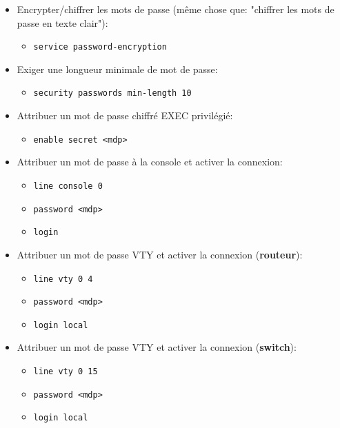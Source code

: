 \documentclass[a4paper]{article}
\begin{document}
\begin{itemize}
    \item Encrypter/chiffrer les mots de passe (même chose que: "chiffrer les mots de passe en texte clair"):
    \begin{itemize}
        \item \texttt{service password-encryption}
    \end{itemize}
    \item Exiger une longueur minimale de mot de passe:
    \begin{itemize}
        \item \texttt{security passwords min-length 10}
    \end{itemize}
    \item Attribuer un mot de passe chiffré EXEC privilégié:
    \begin{itemize}
        \item \texttt{enable secret <mdp>}
    \end{itemize}
    \item Attribuer un mot de passe à la console et activer la connexion:
    \begin{itemize}
        \item \texttt{line console 0}
        \item \texttt{password <mdp>}
        \item \texttt{login}
    \end{itemize}
    \item Attribuer un mot de passe VTY et activer la connexion (\textbf{routeur}):
    \begin{itemize}
        \item \texttt{line vty 0 4}
        \item \texttt{password <mdp>}
        \item \texttt{login local}
    \end{itemize}
    \item Attribuer un mot de passe VTY et activer la connexion (\textbf{switch}):
    \begin{itemize}
        \item \texttt{line vty 0 15}
        \item \texttt{password <mdp>}
        \item \texttt{login local}
    \end{itemize}
\end{itemize}
\end{document}
